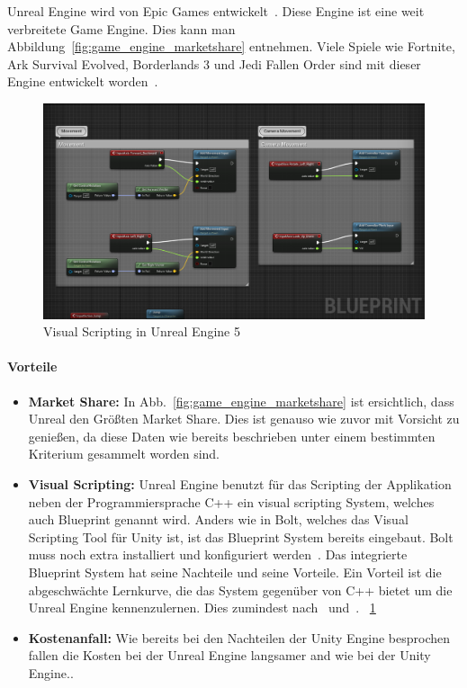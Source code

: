 Unreal Engine wird von Epic Games entwickelt~\cite{UNEAL_ENGINE_OWNER_2022}.
Diese Engine ist eine weit verbreitete Game Engine.
Dies kann man Abbildung~\ref{fig:game_engine_marketshare} entnehmen.
Viele Spiele wie Fortnite, Ark Survival Evolved, Borderlands 3 und Jedi Fallen Order sind mit dieser Engine entwickelt worden~\cite{WIKIPEDIA_UNREAL_GAME_LIST}.

\begin{figure}
    \centering
    \includegraphics[scale=0.3]{pics/visual_scripting_unreal_engine}
    \caption{Visual Scripting in Unreal Engine 5}
    \label{fig:visual_scripting_unreal_engine}
\end{figure}

\paragraph{Vorteile}

\begin{itemize}
    \item \textbf{Market Share:} In Abb.~\ref{fig:game_engine_marketshare} ist ersichtlich, dass Unreal den Größten Market Share.
    Dies ist genauso wie zuvor mit Vorsicht zu genießen, da diese Daten wie bereits beschrieben unter einem bestimmten Kriterium gesammelt worden sind.
    \item \textbf{Visual Scripting:} Unreal Engine benutzt für das Scripting der Applikation neben der Programmiersprache C++ ein visual scripting System, welches auch Blueprint genannt wird.
    Anders wie in Bolt, welches das Visual Scripting Tool für Unity ist, ist das Blueprint System bereits eingebaut.
    Bolt muss noch extra installiert und konfiguriert werden~\cite{Unity_Bolt}.
    Das integrierte Blueprint System hat seine Nachteile und seine Vorteile.
    Ein Vorteil ist die abgeschwächte Lernkurve, die das System gegenüber von C++ bietet um die Unreal Engine kennenzulernen.
    Dies zumindest nach~\cite{Mower_UnrealEngine} und~\cite{jwatte_2017}.
    ~\ref{fig:visual_scripting_unreal_engine}
    \item \textbf{Kostenanfall:} Wie bereits bei den Nachteilen der Unity Engine besprochen fallen die Kosten bei der Unreal Engine langsamer and wie bei der Unity Engine..\cite{UNREAL_ENGINE_PRICING_2022, Unity_Pricing_2}
\end{itemize}

